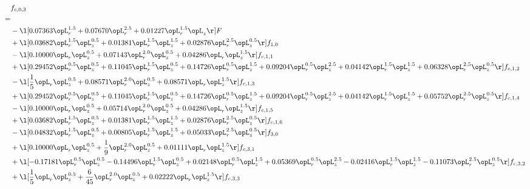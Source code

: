 \begin{alignat}{2} 
\label{eq:f_03_1} 
& f_{c,0,3} \nonumber \\ 
 = \\ 
& - \l[  0.07363 \opL_r^{1.5} +  0.07670 \opL_r^{2.5} +  0.01227 \opL_r^{1.5} \opL_z  \r] F \nonumber \\ 
& + \l[  0.03682 \opL_r^{1.5} \opL_z^{0.5} +  0.01381 \opL_r^{1.5} \opL_z^{1.5} +  0.02876 \opL_r^{2.5} \opL_z^{0.5}  \r] f_{1,0} \nonumber \\ 
& - \l[  0.10000 \opL_r \opL_z^{0.5} +  0.07143 \opL_r^{2.0} \opL_z^{0.5} +  0.04286 \opL_r \opL_z^{1.5}  \r] f_{c,1,1} \nonumber \\ 
& + \l[  0.29452 \opL_r^{0.5} \opL_z^{0.5} +  0.11045 \opL_r^{1.5} \opL_z^{0.5} +  0.14726 \opL_r^{0.5} \opL_z^{1.5} +  0.09204 \opL_r^{0.5} \opL_z^{2.5} +  0.04142 \opL_r^{1.5} \opL_z^{1.5} +  0.06328 \opL_r^{2.5} \opL_z^{0.5}  \r] f_{c,1,2} \nonumber \\ 
& - \l[ \frac{1}{5} \opL_r \opL_z^{0.5} +  0.08571 \opL_r^{2.0} \opL_z^{0.5} +  0.08571 \opL_r \opL_z^{1.5}  \r] f_{c,1,3} \nonumber \\ 
& + \l[  0.29452 \opL_r^{0.5} \opL_z^{0.5} +  0.11045 \opL_r^{1.5} \opL_z^{0.5} +  0.14726 \opL_r^{0.5} \opL_z^{1.5} +  0.09204 \opL_r^{0.5} \opL_z^{2.5} +  0.04142 \opL_r^{1.5} \opL_z^{1.5} +  0.05752 \opL_r^{2.5} \opL_z^{0.5}  \r] f_{c,1,4} \nonumber \\ 
& - \l[  0.10000 \opL_r \opL_z^{0.5} +  0.05714 \opL_r^{2.0} \opL_z^{0.5} +  0.04286 \opL_r \opL_z^{1.5}  \r] f_{c,1,5} \nonumber \\ 
& + \l[  0.03682 \opL_r^{1.5} \opL_z^{0.5} +  0.01381 \opL_r^{1.5} \opL_z^{1.5} +  0.02876 \opL_r^{2.5} \opL_z^{0.5}  \r] f_{c,1,6} \nonumber \\ 
& - \l[  0.04832 \opL_r^{1.5} \opL_z^{0.5} +  0.00805 \opL_r^{1.5} \opL_z^{1.5} +  0.05033 \opL_r^{2.5} \opL_z^{0.5}  \r] f_{3,0} \nonumber \\ 
& + \l[  0.10000 \opL_r \opL_z^{0.5} + \frac{1}{9} \opL_r^{2.0} \opL_z^{0.5} +  0.01111 \opL_r \opL_z^{1.5}  \r] f_{c,3,1} \nonumber \\ 
& + \l[  -0.17181 \opL_r^{0.5} \opL_z^{0.5}   -0.14496 \opL_r^{1.5} \opL_z^{0.5} +  0.02148 \opL_r^{0.5} \opL_z^{1.5} +  0.05369 \opL_r^{0.5} \opL_z^{2.5}   -0.02416 \opL_r^{1.5} \opL_z^{1.5}   -0.11073 \opL_r^{2.5} \opL_z^{0.5}  \r] f_{c,3,2} \nonumber \\ 
& + \l[ \frac{1}{5} \opL_r \opL_z^{0.5} + \frac{6}{45} \opL_r^{2.0} \opL_z^{0.5} +  0.02222 \opL_r \opL_z^{1.5}  \r] f_{c,3,3} \nonumber \\ 

\end{alignat}
